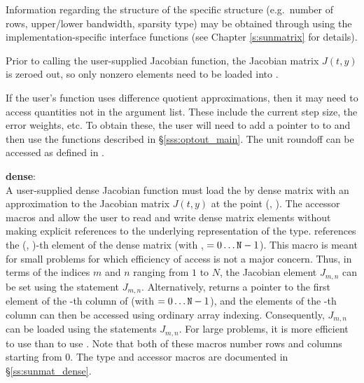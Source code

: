 {
  Information regarding the structure of the specific {\sunmatrix}
  structure (e.g.~number of rows, upper/lower bandwidth, sparsity
  type) may be obtained through using the implementation-specific
  {\sunmatrix} interface functions (see Chapter \ref{s:sunmatrix} for
  details).

  Prior to calling the user-supplied Jacobian function, the Jacobian
  matrix $J(t,y)$ is zeroed out, so only nonzero elements need to be
  loaded into .

  If the user's  function uses difference quotient
  approximations, then it may need to access quantities not in the
  argument list.  These include the current step size, the error
  weights, etc.  To obtain these, the user will need to add a pointer
  to  to  and then use the 
  functions described in \S\ref{sss:optout_main}. The unit roundoff
  can be accessed as  defined in
  .

  {\bf dense}:\\
  A user-supplied dense Jacobian function must load the  by 
  dense matrix  with an approximation to the Jacobian matrix $J(t,y)$
  at the point (, ).  The accessor macros 
  and  allow the user to read and write dense matrix
  elements without making explicit references to the underlying
  representation of the {\sunmatdense} type.
   references the (, )-th
  element of the dense matrix  (with , $= 0\ldots
  {\tt N}-1$). This macro is meant for small problems for which efficiency
  of access is not a major concern.  Thus, in terms of the indices $m$
  and $n$ ranging from $1$ to $N$, the Jacobian element $J_{m,n}$ can
  be set using the statement 
  $J_{m,n}$.  Alternatively,  returns a
  pointer to the first element of the -th column of 
  (with $= 0\ldots {\tt N}-1$), and the elements of the -th column
  can then be accessed using ordinary array indexing.  Consequently,
  $J_{m,n}$ can be loaded using the statements
    $J_{m,n}$.
  For large problems, it is more efficient to use 
  than to use .  Note that both of these macros
  number rows and columns starting from $0$.  The {\sunmatdense} type
  and accessor macros are documented in \S\ref{ss:sunmat_dense}.

}
